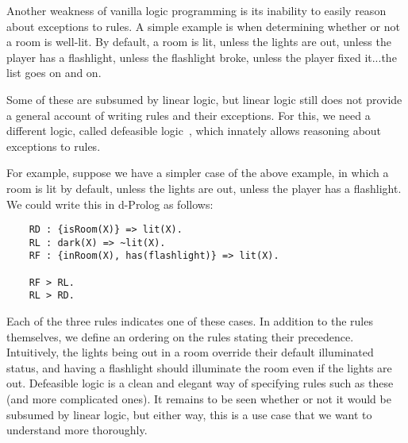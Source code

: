 
Another weakness of vanilla logic programming is its inability to easily
reason about exceptions to rules. A simple example is when determining
whether or not a room is well-lit. By default, a room is lit, unless the
lights are out, unless the player has a flashlight, unless the flashlight
broke, unless the player fixed it...the list goes on and on.

Some of these are subsumed by linear logic, but linear logic still does not
provide a general account of writing rules and their exceptions. For this,
we need a different logic, called defeasible
logic~\cite{Nute:1994:DL:186124.186131,Covington:1996:PPD:230996}, which
innately allows reasoning about exceptions to rules.

For example, suppose we have a simpler case of the above example, in which a
room is lit by default, unless the lights are out, unless the player has a
flashlight. We could write this in d-Prolog as follows:

\begin{verbatim}
    RD : {isRoom(X)} => lit(X).
    RL : dark(X) => ~lit(X).
    RF : {inRoom(X), has(flashlight)} => lit(X).
    
    RF > RL.
    RL > RD.
\end{verbatim}

\noindent
Each of the three rules indicates one of these cases. In addition to the
rules themselves, we define an ordering on the rules stating their
precedence. Intuitively, the lights being out in a room override their
default illuminated status, and having a flashlight should illuminate the
room even if the lights are out. Defeasible logic is a clean and elegant way
of specifying rules such as these (and more complicated ones). It remains to
be seen whether or not it would be subsumed by linear logic, but either way,
this is a use case that we want to understand more thoroughly.

